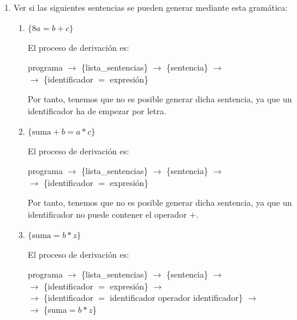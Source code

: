 \begin{ejercicio}
\begin{enumerate}
        \item Ver si las siguientes sentencias se pueden generar mediante esta gramática:
        \begin{enumerate}
            \item $\{8a = b+c\}$

            El proceso de derivación es:

            programa $\longrightarrow$ \{lista\_sentencias\}
            $\longrightarrow$ \{sentencia\} $\longrightarrow$ \\
            $\longrightarrow$ \{identificador $=$ expresión\}

            Por tanto, tenemos que no es posible generar dicha sentencia, ya que un identificador ha de empezar por letra.
            
            \item $\{\text{suma} +b = a\ast c\}$

            El proceso de derivación es:

            programa $\longrightarrow$ \{lista\_sentencias\}
            $\longrightarrow$ \{sentencia\} $\longrightarrow$ \\
            $\longrightarrow$ \{identificador $=$ expresión\}

            Por tanto, tenemos que no es posible generar dicha sentencia, ya que un identificador no puede contener el operador $+$.
            
            \item $\{\text{suma} = b\ast z\}$

            El proceso de derivación es:

            programa $\longrightarrow$ \{lista\_sentencias\}
            $\longrightarrow$ \{sentencia\}
            $\longrightarrow$ \\  $\longrightarrow$
            \{identificador $=$ expresión\}
            $\longrightarrow$ \\ $\longrightarrow$
            \{identificador $=$ identificador operador identificador\}
            $\longrightarrow$ \\ $\longrightarrow$
            \{suma$=b\ast z$\}
        \end{enumerate}
    \end{enumerate}
\end{ejercicio}